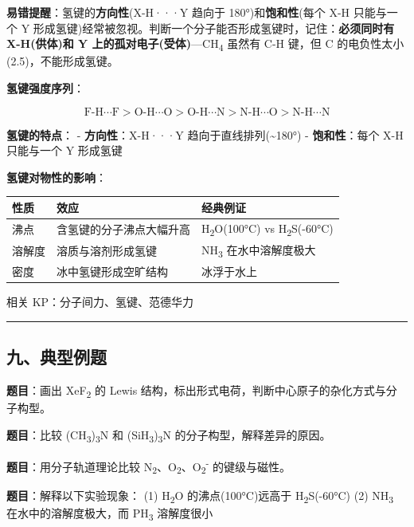 \documentclass[a4paper,11pt]{ctexart}
\newcounter{none}
\newcommand{\箭}{\ensuremath{\rightarrow}}
\newcommand{\左箭}{\ensuremath{\leftarrow}}
\newcommand{\上箭}{\ensuremath{\uparrow}}
\newcommand{\下箭}{\ensuremath{\downarrow}}
\newcommand{\衡}{\ensuremath{\rightleftharpoons}}
\newcommand{\双箭}{\ensuremath{\leftrightarrow}}
\newcommand{\约等于}{\ensuremath{\approx}}
\newcommand{\小于等于}{\ensuremath{\leq}}
\newcommand{\大于等于}{\ensuremath{\geq}}
\newcommand{\不等于}{\ensuremath{\neq}}
\newcommand{\西格马}{\ensuremath{\sigma}}
\newcommand{\派}{\ensuremath{\pi}}
\begin{document}
\textbf{易错提醒}：氢键的\textbf{方向性}(X-H···Y 趋向于 180°)和\textbf{饱和性}(每个 X-H 只能与一个 Y 形成氢键)经常被忽视。判断一个分子能否形成氢键时，记住：\textbf{必须同时有 X-H(供体)和 Y 上的孤对电子(受体)}---CH\textsubscript{4} 虽然有 C-H 键，但 C 的电负性太小(2.5)，不能形成氢键。

\textbf{氢键强度序列}：

\[
\text{F-H} \cdots \text{F} > \text{O-H} \cdots \text{O} > \text{O-H} \cdots \text{N} > \text{N-H} \cdots \text{O} > \text{N-H} \cdots \text{N}
\]

\textbf{氢键的特点}：
- \textbf{方向性}：X-H···Y 趋向于直线排列(\textasciitilde180°)
- \textbf{饱和性}：每个 X-H 只能与一个 Y 形成氢键

\textbf{氢键对物性的影响}：

{\def\LTcaptype{none} %
\begin{longtable}[]{@{}lll@{}}
\toprule\noalign{}
性质 & 效应 & 经典例证 \\
\midrule\noalign{}
\endhead
\bottomrule\noalign{}
\endlastfoot
沸点 & 含氢键的分子沸点大幅升高 & H\textsubscript{2}O(100°C) vs H\textsubscript{2}S(-60°C) \\
溶解度 & 溶质与溶剂形成氢键 & NH\textsubscript{3} 在水中溶解度极大 \\
密度 & 冰中氢键形成空旷结构 & 冰浮于水上 \\
\end{longtable}
}

相关 KP：分子间力、氢键、范德华力

\begin{center}\rule{0.5\linewidth}{0.5pt}\end{center}

\subsection{九、典型例题}\label{ux4e5dux5178ux578bux4f8bux9898}

\textbf{题目}：画出 XeF\textsubscript{2} 的 Lewis 结构，标出形式电荷，判断中心原子的杂化方式与分子构型。

\textbf{题目}：比较 (CH\textsubscript{3})\textsubscript{3}N 和 (SiH\textsubscript{3})\textsubscript{3}N 的分子构型，解释差异的原因。

\textbf{题目}：用分子轨道理论比较 N\textsubscript{2}、O\textsubscript{2}、O\textsubscript{2}\textsuperscript{-} 的键级与磁性。

\textbf{题目}：解释以下实验现象：
(1) H\textsubscript{2}O 的沸点(100°C)远高于 H\textsubscript{2}S(-60°C)
(2) NH\textsubscript{3} 在水中的溶解度极大，而 PH\textsubscript{3} 溶解度很小
\end{document}
